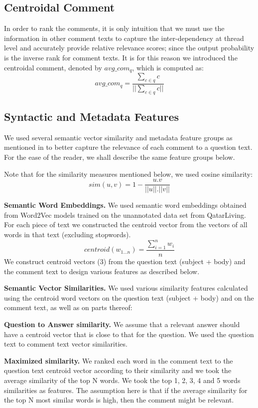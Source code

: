 \documentclass[12pt, a4paper, oneside]{Thesis} %
\begin{document}
\subsection{Centroidal Comment}
\label{subsection:centroidal-comment}

In order to rank the comments, it is only intuition that we must use the information in other comment texts to capture the inter-dependency at thread level and accurately provide relative relevance scores; since the output probability is the inverse rank for comment texts. It is for this reason we introduced the centroidal comment, denoted by $avg\_com_q$, which is computed as:
\[ avg\_com_q = \frac{\sum\limits_{c \in q} c}{||\sum\limits_{c \in q} c||} \tag{1} \label{equation:1} \]

\subsection{Syntactic and Metadata Features}
\label{subsection:extra-feat}
We used several semantic vector similarity and metadata feature groups as mentioned in \cite{mihaylov2016semanticz} to better capture the relevance of each comment to a question text. For the ease of the reader, we shall describe the same feature groups below. 

Note that for the similarity measures mentioned below, we used cosine similarity:
\[ sim(u, v) = 1 - \frac{u.v}{||u||.||v||} \tag{2} \label{equation:2} \]

\textbf{Semantic Word Embeddings.} We used semantic word embeddings obtained from Word2Vec models trained on the unannotated data set from QatarLiving. For each piece of text we constructed the centroid vector from the vectors of all words in that text (excluding stopwords).
\[ centroid(w_{1...n}) = \frac{\sum\limits_{i=1}^{n} w_i}{n} \tag{3} \label{equation:3} \]
We construct centroid vectors (3) from the question text (subject + body) and the comment text to design various features as described below.

\textbf{Semantic Vector Similarities.} We used various similarity features calculated using the centroid word vectors on the question text (subject + body) and on the comment text, as well as on parts thereof:

\textbf{Question to Answer similarity.} We assume that a relevant answer should have a centroid vector that is close to that for the question. We used the question text to comment text vector similarities.

\textbf{Maximized similarity.} We ranked each word in the comment text to the question text centroid vector according to their similarity and we took the average similarity of the top N words. We took the top 1, 2, 3, 4 and 5 words similarities as features. The assumption here is that if the average similarity for the top N most similar words is high, then the comment might be relevant.
\end{document}

